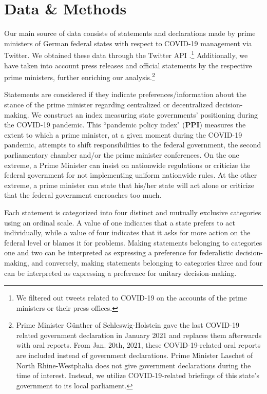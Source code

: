 \documentclass[authoryear,12pt, 3p]{elsarticle}
\theoremstyle{break}
\begin{document}
\section{Data \& Methods}\label{sec.datamethods}
Our main source of data consists of statements and declarations made by prime ministers of German federal states with respect to COVID-19 management via Twitter. We obtained these data through the Twitter API \citep{Kearney2019}.\footnote{
	We filtered out tweets related to COVID-19 on the accounts of the prime ministers or their press offices.
} Additionally, we have taken into account press releases and official statements by the respective prime ministers, further enriching our analysis.\footnote{
	Prime Minister Günther of Schleswig-Holstein gave the last COVID-19 related government declaration in January 2021 and replaces them afterwards with oral reports. From Jan. 20th, 2021, these COVID-19-related oral reports are included instead of government declarations. Prime Minister Laschet of North Rhine-Westphalia does not give government declarations during the time of interest. Instead, we utilize COVID-19-related briefings of this state’s government to its local parliament.}

Statements are considered if they indicate preferences/information about the stance of the prime minister regarding centralized or decentralized decision-making. We construct an index measuring state governments’ positioning during the COVID-19 pandemic. This ``pandemic policy index" (\textbf{PPI}) measures the extent to which a prime minister, at a given moment during the COVID-19 pandemic, attempts to shift responsibilities to the federal government, the second parliamentary chamber and/or the prime minister conferences. On the one extreme, a Prime Minister can insist on nationwide regulations or criticize the federal government for not implementing uniform nationwide rules. At the other extreme, a prime minister can state that his/her state will act alone or criticize that the federal government encroaches too much.

Each statement is categorized into four distinct and mutually exclusive categories using an ordinal scale. A value of one indicates that a state prefers to act individually, while a value of four indicates that it asks for more action on the federal level or blames it for problems. Making statements belonging to categories one and two can be interpreted as expressing a preference for federalistic decision-making, and conversely, making statements belonging to categories three and four can be interpreted as expressing a preference for unitary decision-making.
\end{document}
